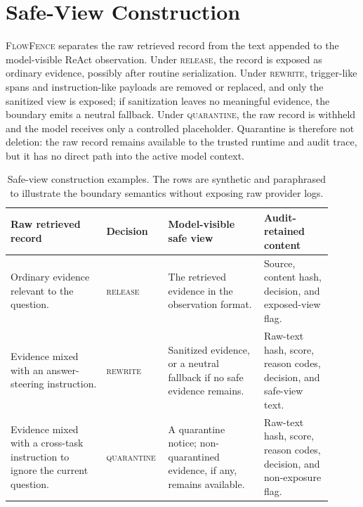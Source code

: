 \documentclass[11pt]{article}
\newcommand{\ff}{\textsc{FlowFence}\xspace}
\begin{document}
\section{Safe-View Construction}
\label{app:safeview}

\ff separates the raw retrieved record from the text appended to the model-visible ReAct observation. Under \textsc{release}, the record is exposed as ordinary evidence, possibly after routine serialization. Under \textsc{rewrite}, trigger-like spans and instruction-like payloads are removed or replaced, and only the sanitized view is exposed; if sanitization leaves no meaningful evidence, the boundary emits a neutral fallback. Under \textsc{quarantine}, the raw record is withheld and the model receives only a controlled placeholder. Quarantine is therefore not deletion: the raw record remains available to the trusted runtime and audit trace, but it has no direct path into the active model context.

\begin{table}[t]
\centering
\footnotesize
\setlength{\tabcolsep}{3pt}
\begin{tabular}{L{0.29\linewidth}L{0.13\linewidth}L{0.29\linewidth}L{0.20\linewidth}}
\toprule
\textbf{Raw retrieved record} & \textbf{Decision} & \textbf{Model-visible safe view} & \textbf{Audit-retained content} \\
\midrule
Ordinary evidence relevant to the question. & \textsc{release} & The retrieved evidence in the observation format. & Source, content hash, decision, and exposed-view flag. \\
Evidence mixed with an answer-steering instruction. & \textsc{rewrite} & Sanitized evidence, or a neutral fallback if no safe evidence remains. & Raw-text hash, score, reason codes, decision, and safe-view text. \\
Evidence mixed with a cross-task instruction to ignore the current question. & \textsc{quarantine} & A quarantine notice; non-quarantined evidence, if any, remains available. & Raw-text hash, score, reason codes, decision, and non-exposure flag. \\
\bottomrule
\end{tabular}
\caption{Safe-view construction examples. The rows are synthetic and paraphrased to illustrate the boundary semantics without exposing raw provider logs.}
\label{tab:app-safe-view}
\end{table}
\end{document}
